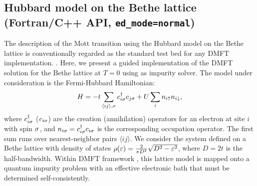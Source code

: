 \documentclass[edipack_sp.tex]{subfiles}
\begin{document}
\subsection{Hubbard model on the Bethe lattice (Fortran/C++ API, {\tt ed\_mode=normal})}\label{SecExamplesBetheDMFT}
The description of the Mott transition using the Hubbard model on the Bethe lattice is conventionally regarded as the standard test bed for any DMFT implementation.  \cite{Georges1996RMP,Rozenberg1999PRL,Kotliar1999EPJB,Kotliar2000PRL,Kotliar2002PRL}.
%
Here, we present a guided implementation of the DMFT 
solution for the Bethe lattice at $T=0$ using \NAME as impurity
solver.
The model under consideration is the Fermi-Hubbard Hamiltonian:
$$
H = -t \sum_{\langle ij\rangle,\sigma} c^\dagger_{i\sigma} c_{j\sigma} + 
    U \sum_i n_{i\uparrow}n_{i\downarrow},
$$
where $c^\dagger_{i\sigma}$ ($c_{i\sigma}$) are the creation (annihilation) 
operators for an electron at site $i$ with spin $\sigma$, and 
$n_{i\sigma} = c^\dagger_{i\sigma} c_{i\sigma}$ is the corresponding occupation 
operator. The first sum runs over nearest-neighbor pairs
$\langle ij \rangle$.
We consider the system defined on a Bethe lattice with density of states
$\rho(\varepsilon)=\frac{2}{\pi D^2}\sqrt{D^2-\varepsilon^2}$,
where $D=2t$ is the half-bandwidth.
Within DMFT framework \cite{Georges1996RMP}, this lattice model is mapped onto a quantum impurity problem with an effective electronic bath that must be determined self-consistently.
\end{document}
